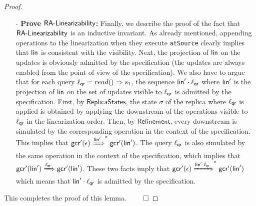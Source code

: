 {\begin {proof}
\begin{itemize}
\item[-] {\bf Prove $\mathsf{\CRDTLinshort{}}$:} Finally, we describe the proof of the fact that $\mathsf{\CRDTLinshort{}}$ is an inductive invariant. As already mentioned, appending operations to the linearization when they execute \lstinline|atSource| clearly implies that $\alinord$ is consistent with the visibility. Next, the projection of $\alinord$ on the updates is obviously admitted by the specification (the updates are always enabled from the point of view of the specification).
We also have to argue that for each query $\alabel_{\mathsf{qr}} = \alabellongind[read]{}{s_1}{}$, the sequence $\alinord'\cdot \alabel_{\mathsf{qr}}$ where $\alinord'$ is the projection of $\alinord$ on the set of updates
visible to $\alabel_{\mathsf{qr}}$ is admitted by the specification. First, by $\mathsf{ReplicaStates}$, the state $\sigma$ of the replica where $\alabel_{\mathsf{qr}}$ is applied is obtained by applying the downstream of the operations visible to $\alabel_{\mathsf{qr}}$ in the linearization order. Then, by $\mathsf{Refinement}$, every downstream is simulated by the corresponding operation in the context of the specification. This implies that $\gconfres'(\epsilon)\xRightarrow{\alinord'}^*\gconfres'(\alinord')$. The query $\alabel_{\mathsf{qr}}$ is also simulated by the same operation in the context of the specification, which implies that $\gconfres'(\alinord')\xRightarrow{\alabel_{\mathsf{qr}}}\gconfres'(\alinord')$. These two facts imply that $\gconfres'(\epsilon)\xRightarrow{\alinord'\cdot \alabel_{\mathsf{qr}}}^*\gconfres'(\alinord')$ which means that $\alinord'\cdot \alabel_{\mathsf{qr}}$ is admitted by the specification.
\end{itemize}

This completes the proof of this lemma. $\qed$
\end {proof}
}






































